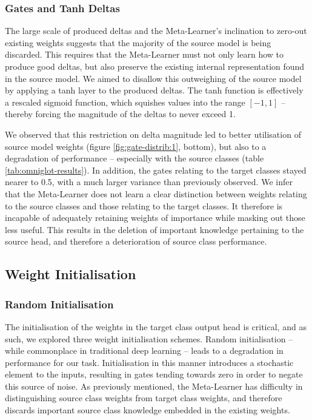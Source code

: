 \documentclass{report}
\begin{document}
\subsubsection{Gates and Tanh Deltas}
The large scale of produced deltas and the Meta-Learner's inclination to zero-out existing weights suggests that the majority of the source model is being discarded. This requires that the Meta-Learner must not only learn how to produce good deltas, but also preserve the existing internal representation found in the source model. We aimed to disallow this outweighing of the source model by applying a tanh layer to the produced deltas. The tanh function is effectively a rescaled sigmoid function, which squishes values into the range $[-1, 1]$ -- thereby forcing the magnitude of the deltas to never exceed 1. \par
We observed that this restriction on delta magnitude led to better utilisation of source model weights (figure \ref{fig:gate-distrib:1}, bottom), but also to a degradation of performance -- especially with the source classes (table \ref{tab:omniglot-results}). In addition, the gates relating to the target classes stayed nearer to 0.5, with a much larger variance than previously observed. We infer that the Meta-Learner does not learn a clear distinction between weights relating to the source classes and those relating to the target classes. It therefore is incapable of adequately retaining weights of importance while masking out those less useful. This results in the deletion of important knowledge pertaining to the source head, and therefore a deterioration of source class performance.

\subsection{Weight Initialisation}
\subsubsection{Random Initialisation}
The initialisation of the weights in the target class output head is critical, and as such, we explored three weight initialisation schemes. Random initialisation -- while commonplace in traditional deep learning -- leads to a degradation in performance for our task. Initialisation in this manner introduces a stochastic element to the inputs, resulting in gates tending towards zero in order to negate this source of noise. As previously mentioned, the Meta-Learner has difficulty in distinguishing source class weights from target class weights, and therefore discards important source class knowledge embedded in the existing weights.
\end{document}

